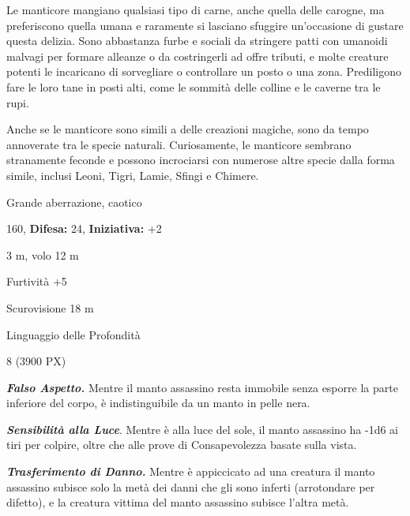 \begin{multicols}{2}
{Le manticore mangiano qualsiasi tipo di carne, anche quella delle carogne, ma preferiscono quella umana e raramente si lasciano sfuggire un'occasione di gustare questa delizia. Sono abbastanza furbe e sociali da stringere patti con umanoidi malvagi per formare alleanze o da costringerli ad offre tributi, e molte creature potenti le incaricano di sorvegliare o controllare un posto o una zona. Prediligono fare le loro tane in posti alti, come le sommità delle colline e le caverne tra le rupi.

Anche se le manticore sono simili a delle creazioni magiche, sono da tempo annoverate tra le specie naturali. Curiosamente, le manticore sembrano stranamente feconde e possono incrociarsi con numerose altre specie dalla forma simile, inclusi Leoni, Tigri, Lamie, Sfingi e Chimere.

\noindent
\begin{description}[noitemsep, topsep=0pt, parsep=0pt, partopsep=0pt, leftmargin=0cm, labelwidth=2.2cm]
	\item[\textbf{Taglia/Tipo:}] Grande aberrazione, caotico
	\item[\textbf{Caratt.:}] 
	\item[\textbf{Punti Ferita:}] 160,  \textbf{Difesa:} 24,  \textbf{Iniziativa:} +2
	\item[\textbf{Movimento:}] 3 m, volo 12 m
	\item[\textbf{Tiri Salvez.:}] 
	\item[\textbf{Comp.:}] Furtività +5
	\item[\textbf{Sensi:}] Scurovisione 18 m
	\item[\textbf{Linguaggi:}] Linguaggio delle Profondità
	\item[\textbf{Sfida:}] 8 (3900 PX)\smallskip
\end{description}

\emph{\textbf{Falso Aspetto.}} Mentre il manto assassino resta immobile senza esporre la parte inferiore del corpo, è indistinguibile da un manto in pelle nera.

\emph{\textbf{Sensibilità alla Luce}}. Mentre è alla luce del sole, il manto assassino ha -1d6 ai tiri per colpire, oltre che alle prove di Consapevolezza basate sulla vista.

\emph{\textbf{Trasferimento di Danno.}} Mentre è appiccicato ad una creatura il manto assassino subisce solo la metà dei danni che gli sono inferti (arrotondare per difetto), e la creatura vittima del manto assassino subisce l'altra metà.

}
\end{multicols}
